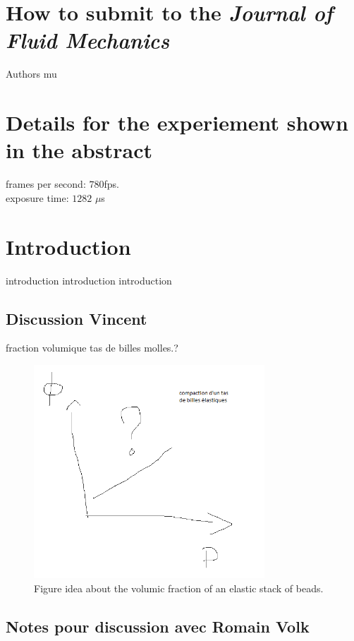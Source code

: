 \documentclass[lineno]{jfm}
\begin{document}
\section{How to submit to the \emph{Journal of Fluid Mechanics}}
\label{sec:intro}

 Authors mu

\section{Details for the experiement shown in the abstract}

frames per second: $780$fps.\\
exposure time: $1282$  $\mu$s\\



\section{Introduction}
introduction introduction introduction

\subsection{Discussion Vincent}

fraction volumique tas de billes molles.?

\begin{figure}
\includegraphics[height=8cm]{figures/elasticBeadsStack_VolumicFraction.png}
\caption{Figure idea about the volumic fraction of an elastic stack of beads.}
\label{fig:volFrac_elasticStac}
\end{figure}

\subsection{Notes pour discussion avec Romain Volk}
\end{document}
